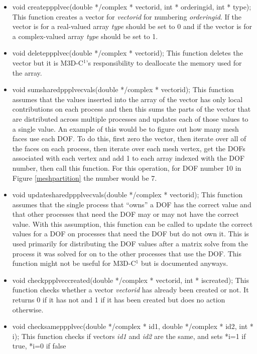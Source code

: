 \begin{itemize}
\item   void createppplvec(double */complex * vectorid, int * orderingid, int * type); This function creates a vector 
for \textit{vectorid}
 for numbering \textit{orderingid}. If the vector is for a real-valued array \textit{type}
should be set to 0 and if the vector is for  a complex-valued array \textit{type} should be set to 1. 
\item   void deleteppplvec(double */complex * vectorid); This function deletes the vector but it is M3D-C$^1$'s 
responsibility to deallocate the memory used for the array.
\item   void sumsharedppplvecvals(double */complex * vectorid);  This function assumes that the values inserted into the
array of the vector has only local contributions on each process and then this sums the parts
of the vector that are distributed across multiple processes and updates each of those values
to a single value.  An example of this would be to figure out how many mesh faces use each DOF.  To do this, 
first zero the vector, then 
iterate over all of the faces on each process, then iterate over each mesh vertex, get the DOFs
associated with each vertex and add 1 to each array indexed with the DOF number, then call this function.
For this operation, for DOF number 10 in Figure \ref{meshpartition} the number would be 7.
\item   void updatesharedppplvecvals(double */complex * vectorid);  This function assumes that the single process that ``owns'' a DOF
has the correct value and that other processes that need the DOF may or may not have the correct value.  With
this assumption, this function can be called to update the correct values for a DOF on processes
that need the DOF but do not own it.  This is used primarily for distributing the DOF values after a matrix solve
from the process it was solved for on to the other processes that use the DOF.  This function might not be useful
for M3D-C$^1$ but is documented anyways.
\item   void checkppplveccreated(double */complex * vectorid, int * iscreated); This function checks whether a vector \textit{vectorid} 
has already been created or not.  It returns 0 if it has not and 1 if it has been created but does no
action otherwise.  
\item void checksameppplvec(double */complex * id1, double */complex * id2, int * i); This function checks if vectors 
\textit{id1} and \textit{id2} are the same, and sets *i=1 if true, *i=0 if false
\end{itemize}

